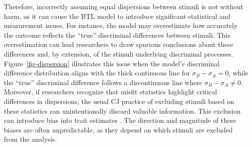 \documentclass[
  authoryear,
  preprint,
  1p]{elsarticle}
\begin{document}
Therefore, incorrectly assuming equal dispersions between stimuli is not
without harm, as it can cause the BTL model to introduce significant
statistical and measurement issues. For instance, the model may
overestimate how accurately the outcome reflects the ``true''
discriminal differences between stimuli. This overestimation can lead
researchers to draw spurious conclusions about these differences
\citep[pp.~370]{McElreath_2020} and, by extension, of the stimuli
underlying discriminal processes. Figure~\ref{fig-dispersion}
illustrates this issue when the model's discriminal difference
distribution aligns with the thick continuous line for
\(\sigma_{B}-\sigma_{A}=0\), while the ``true'' discriminal difference
follows a discontinuous line where \(\sigma_{B}-\sigma_{A} \neq 0\).
Moreover, if researchers recognize that misfit statistics highlight
critical differences in dispersions, the usual CJ practice of excluding
stimuli based on these statistics
\citep{Pollitt_2012a, Pollitt_2012b, vanDaal_et_al_2016, Goossens_et_al_2018}
can unintentionally discard valuable information. This exclusion can
introduce bias into trait estimates
\citep[chap.~12]{Zimmerman_1994, McElreath_2020}. The direction and
magnitude of these biases are often unpredictable, as they depend on
which stimuli are excluded from the analysis.
\end{document}
